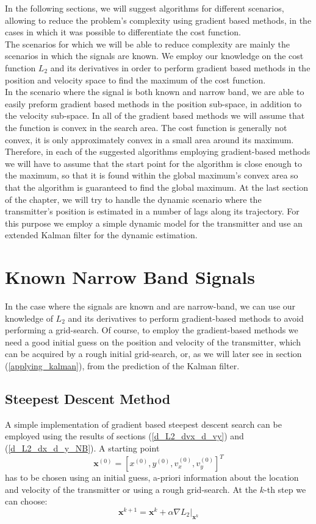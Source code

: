 \documentclass[10pt,a4paper]{report}
\begin{document}
In the following sections, we will suggest algorithms for
different scenarios, allowing to reduce the problem's complexity using gradient based methods, in the cases
in which it was possible to differentiate the cost function.\\
The scenarios for which we will be able to reduce complexity are mainly the scenarios in which
the signals are known. We employ our knowledge on the cost function $L_2$ and its
derivatives in order to perform gradient based methods in the position and velocity space to find the maximum of the cost function.\\
In the scenario where the signal is both known and narrow band, we are able to easily preform gradient based
methods in the position sub-space, in addition to the velocity sub-space.
In all of the gradient based methods we will assume that the function is convex in the search area.
The cost function is generally not convex, it is only approximately convex in a small area around its maximum.\\
Therefore, in each of the suggested algorithms employing gradient-based methods we will have to assume that
the start point for the algorithm is close enough to the maximum, so that it is found within the global maximum's convex area so that the algorithm is guaranteed to find the global maximum.
At the last section of the chapter, we will try to handle the dynamic scenario where the transmitter's
position is estimated in a number of lags along its trajectory. For this purpose we employ a simple
dynamic model for the transmitter and use an extended Kalman filter for the dynamic estimation.

\section{Known Narrow Band Signals}
In the case where the signals are known and are narrow-band, we can use our knowledge of
$L_2$ and its derivatives to perform gradient-based methods to avoid performing a grid-search.
Of course, to employ the gradient-based methods we need a good initial guess on the position and
velocity of the transmitter, which can be acquired by a rough initial grid-search, or, as we will later see
in section (\ref{applying_kalman}), from the prediction of the Kalman filter.\\

\subsection{Steepest Descent Method}
A simple implementation of gradient based steepest descent search can be employed using the results of sections  (\ref{d_L2_dvx_d_vy}) and (\ref{d_L2_dx_d_y_NB}). 
A starting point $$\mathbf{x}^{(0)}=[x^{(0)}, y^{(0)}, v_x^{(0)}, v_y^{(0)}]^T$$ has to be chosen using an initial guess, a-priori information about the location and velocity of the transmitter or using a rough grid-search.
At the $k$-th step we can choose: 
\begin{equation}
\mathbf{x}^{k+1}=\mathbf{x}^{k}+\alpha \nabla L_2 |_{\mathbf{x}^k}
\end{equation}
\end{document}
